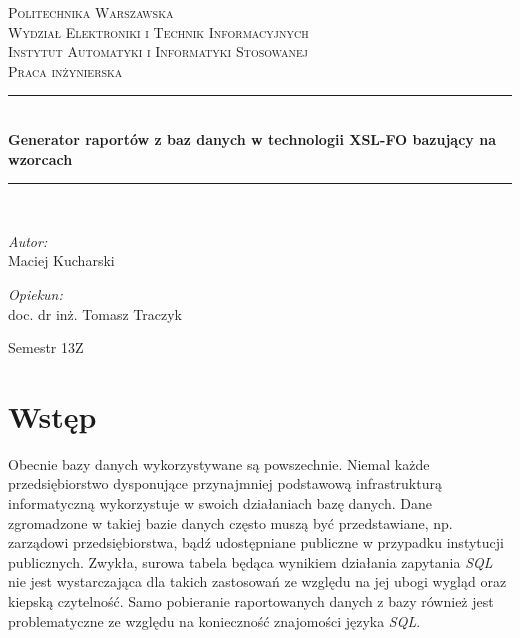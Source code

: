 \documentclass[11pt,a4paper]{article}
\newcommand{\HRule}{\rule{\linewidth}{0.5mm}}
\begin{document}
\begin{titlepage}
\begin{center}
\textsc{\LARGE Politechnika Warszawska}\\[0.5cm]
\textsc{\Large Wydział Elektroniki i Technik Informacyjnych}\\
\textsc{\Large Instytut Automatyki i Informatyki Stosowanej}\\[1.5cm]

\textsc{\Large Praca inżynierska} \\[0.5cm]
\HRule \\[0.4cm]
{ \huge \bfseries Generator raportów z baz danych w technologii XSL-FO  bazujący na wzorcach \\[0.4cm]}
\HRule \\[1.5cm]

\begin{minipage} {0.4\textwidth}
\begin{flushleft} \large
\emph{Autor:}\\
 Maciej Kucharski 
\end{flushleft}
\end{minipage}
\begin{minipage} {0.4\textwidth}
\begin{flushright} \large

\emph{Opiekun:}\\
doc. dr inż. Tomasz Traczyk

\end{flushright}
\end{minipage}	
\vfill
\large Semestr 13Z

	\end{center}
\end{titlepage}
 
\tableofcontents
\newpage

\section{Wstęp} \label{sec:wst}
Obecnie bazy danych wykorzystywane są powszechnie. Niemal każde przedsiębiorstwo dysponujące przynajmniej podstawową infrastrukturą informatyczną wykorzystuje w swoich działaniach bazę danych. Dane zgromadzone w takiej bazie danych często muszą być przedstawiane, np. zarządowi przedsiębiorstwa, bądź udostępniane publiczne w przypadku instytucji publicznych. Zwykła, surowa tabela będąca wynikiem działania zapytania \emph{SQL} nie jest wystarczająca dla takich zastosowań ze względu na jej ubogi wygląd oraz kiepską czytelność.  Samo pobieranie raportowanych danych z bazy również jest problematyczne ze względu na konieczność znajomości języka \emph{SQL}. 
\end{document}
